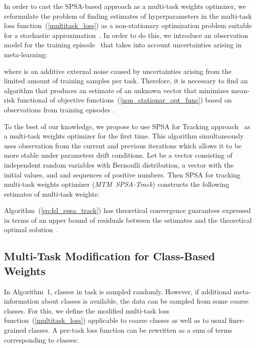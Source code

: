 \documentclass{article}
\begin{document}
In order to cast the SPSA-based approach as a multi-task weights optimizer, we reformulate the problem of finding estimates of hyperparameters  in the multi-task loss function~(\ref{multitask_loss}) as a non-stationary optimization problem suitable for a stochastic approximation~\cite{granichin2014simultaneous,boiarov2020simultaneous}. In order to do this, we introduce an observation model for the training episode~ that takes into account uncertainties arising in meta-learning:

where  is an additive external noise caused by uncertainties arising from the limited amount of training samples per task. Therefore, it is necessary to find an algorithm that produces an estimate  of an unknown vector  that minimizes mean-risk functional of objective functions~(\ref{non_stationar_opt_func}) based on observations  from training episodes .















To the best of our knowledge, we propose to use SPSA for Tracking approach~\cite{granichin2014simultaneous} as a multi-task weights optimizer for the first time. This algorithm simultaneously uses observation from the current and previous iterations which allows it to be more stable under parameters drift conditions. Let  be a vector consisting of independent random variables with Bernoulli distribution,  a vector with the initial values, and  and  sequences of positive numbers. Then SPSA for tracking multi-task weights optimizer ({\it MTM~SPSA-Track}) constructs the following estimates of multi-task weights: 



Algorithm~(\ref{eq:fsl_spsa_track}) has theoretical convergence guarantees expressed in terms of an upper bound of residuals between the estimates and the theoretical optimal solution~\cite{granichin2014simultaneous}.
\subsection{Multi-Task Modification for Class-Based Weights}

In Algorithm~1,  classes in task  is sampled randomly. However, if additional meta-information about classes is available, the data can be sampled from some coarse classes. For this, we define the modified multi-task loss function~(\ref{multitask_loss}) applicable to coarse classes as well as to usual finer-grained classes. A per-task loss function  can be rewritten as a sum of terms corresponding to classes:
\end{document}
